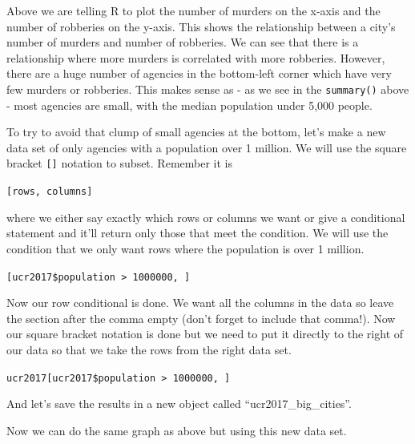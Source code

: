 \documentclass[
  12pt,
]{book}
\newenvironment{Shaded}{\begin{snugshade}}{\end{snugshade}}
\newcommand{\DecValTok}[1]{\textcolor[rgb]{0.06,0.06,0.06}{#1}}
\newcommand{\KeywordTok}[1]{\textcolor[rgb]{0.27,0.27,0.27}{\textbf{#1}}}
\newcommand{\NormalTok}[1]{#1}
\newcommand{\OperatorTok}[1]{\textcolor[rgb]{0.43,0.43,0.43}{\textbf{#1}}}
\newcommand{\StringTok}[1]{\textcolor[rgb]{0.5,0.5,0.5}{#1}}
\begin{document}
Above we are telling R to plot the number of murders on the x-axis and the number of robberies on the y-axis. This shows the relationship between a city's number of murders and number of robberies. We can see that there is a relationship where more murders is correlated with more robberies. However, there are a huge number of agencies in the bottom-left corner which have very few murders or robberies. This makes sense as - as we see in the \texttt{summary()} above - most agencies are small, with the median population under 5,000 people.

To try to avoid that clump of small agencies at the bottom, let's make a new data set of only agencies with a population over 1 million. We will use the square bracket \texttt{{[}{]}} notation to subset. Remember it is

\texttt{{[}rows,\ columns{]}}

where we either say exactly which rows or columns we want or give a conditional statement and it'll return only those that meet the condition. We will use the condition that we only want rows where the population is over 1 million.

\texttt{{[}ucr2017\$population\ \textgreater{}\ 1000000,\ {]}}

Now our row conditional is done. We want all the columns in the data so leave the section after the comma empty (don't forget to include that comma!). Now our square bracket notation is done but we need to put it directly to the right of our data so that we take the rows from the right data set.

\texttt{ucr2017{[}ucr2017\$population\ \textgreater{}\ 1000000,\ {]}}

And let's save the results in a new object called ``ucr2017\_big\_cities''.

\begin{Shaded}
\end{Shaded}

Now we can do the same graph as above but using this new data set.

\begin{Shaded}
\end{Shaded}
\end{document}
